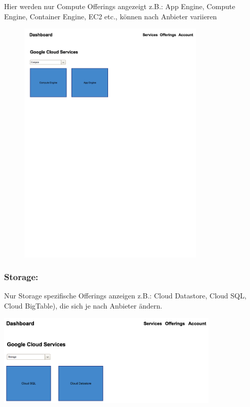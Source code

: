 \documentclass[11pt]{scrartcl}
\begin{document}
Hier werden nur Compute Offerings angezeigt z.B.: App Engine, Compute Engine, 
Container Engine, EC2 etc., können nach Anbieter variieren
\begin{figure}[h]
   \includegraphics[width=0.8\textwidth]{homescreen_google_compute}
\end{figure}
 



\subsubsection{Storage:}

Nur Storage spezifische Offerings anzeigen z.B.: Cloud Datastore, Cloud SQL, 
Cloud BigTable), die sich je nach Anbieter ändern.

  \includegraphics[width=0.8\textwidth]{homescreen_google_storage}
\end{document}
